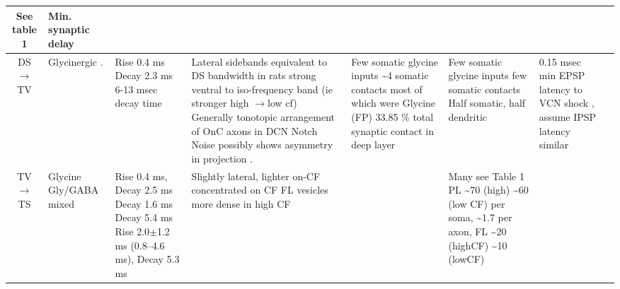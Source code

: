\begin{longtable}{cYYYYYYY}
See table 1 \citep{SmithRhode:1989}     
& 
Min. synaptic delay 
\\ \midrule
DS\ensuremath{\rightarrow}TV                        
& %
Glycinergic \citep{DoucetRyugoEtAl:1999,OertelWuEtAl:1990,OstapoffMorestEtAl1999,SpirouDavisEtAl:1999,ZhangOertel:1993}. 
& 
Rise 0.4 ms Decay 2.3 ms \citep{AwatramaniTurecekEtAl:2005}
6-13 msec decay time \citep{FerragamoGoldingEtAl:1998a,HartyManis:1996,HartyManis:1998,LeaoOleskevichEtAl:2004}
& 
Lateral sidebands equivalent to DS bandwidth
\citep{OstapoffMorestEtAl:1999,SpirouDavisEtAl:1999} 
in rats strong ventral to iso-frequency band (ie stronger high \ensuremath{\rightarrow}low cf)
\citep{DoucetRyugoEtAl:1999,FriedlandPongstapornEtAl:2003} 
Generally tonotopic arrangement of OnC axons in DCN \citep{ArnottWallaceEtAl:2004}
Notch Noise possibly shows asymmetry in projection \citep{ReissYoung:2005}.      
& 
Few somatic glycine inputs 
\citep{OsenOttersenEtAl:1990,OstapoffMorestEtAl1999:1999,ZhangOertel:1993}
\~{}4 somatic contacts most of which were Glycine (FP) \citep{Alibardi:1999}
33.85 \% total synaptic contact in deep layer \citep[rat][]{RubioJuiz:2004}
& 
Few somatic glycine inputs \citep{OsenOttersenEtAl:1990,OstapoffMorestEtAl:1999,ZhangOertel:1993} 
few  somatic contacts \citep{Alibardi:1999}                   
Half somatic, half dendritic \citep[rat][]{RubioJuiz:2004}
& 
0.15 msec min EPSP latency to VCN shock , assume IPSP latency similar
\citep{ZhangOertel:1993}\\ \midrule
TV\ensuremath{\rightarrow}TS                        
& %
Glycine \citep{OertelWickesberg:1993,OstapoffMorestEtAl:1999,SaintBensonEtAl:1991,WickesbergOertel:1993}
Gly\slash GABA mixed \citep[Cat,][]{OsenOttersenEtAl:1990}                  
& %
Rise 0.4 ms, Decay 2.5 ms \citep[spontaneous IPSCs in rat MNTB neurons,][]{AwatramaniTurecekEtAl:2005}
Decay 1.6 ms \citep[mouse VCN,]{Oertel:1983}
Decay 5.4 ms \citep{OertelWickesberg:1993,WickesbergOertel:1993}    
Rise 2.0$\pm$1.2 ms (0.8--4.6 ms), Decay 5.3 ms \citep[Gly puffs at 22$^\circ$C (Q$_{10}$ 2.1) in  guinea pig VCN,][]{HartyManis:1998}
& %
Slightly lateral, lighter on-CF \citep{OstapoffMorestEtAl:1999} 
concentrated on CF \citep{ZhangOertel:1993} 
FL vesicles more dense in high CF \citep{JosephsonMorest:1998}                        
& %
& %
Many \citep{OstapoffMorestEtAl:1999} see
Table 1 \citep{SmithRhode:1989} 
PL \~{}70 (high) \~{}60 (low CF) per soma,
\~{}1.7 per axon, 
FL \~{}20 (highCF) \~{}10 (lowCF)  \citep{JosephsonMorest:1998}                        
& %

\end{longtable}
